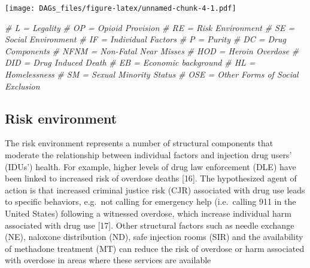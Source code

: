 \documentclass[
]{article}
\newenvironment{Shaded}{\begin{snugshade}}{\end{snugshade}}
\newcommand{\CommentTok}[1]{\textcolor[rgb]{0.56,0.35,0.01}{\textit{#1}}}
\begin{document}
\texttt{[image: DAGs\_files/figure-latex/unnamed-chunk-4-1.pdf]}

\begin{Shaded}
\begin{Highlighting}[]
\CommentTok{\# L = Legality}
\CommentTok{\# OP = Opioid Provision}
\CommentTok{\# RE = Risk Environment}
\CommentTok{\# SE = Social Environment}
\CommentTok{\# IF = Individual Factors}
\CommentTok{\# P = Purity}
\CommentTok{\# DC = Drug Components}
\CommentTok{\# NFNM = Non{-}Fatal Near Misses}
\CommentTok{\# HOD = Heroin Overdose}
\CommentTok{\# DID = Drug Induced Death }
\CommentTok{\# EB = Economic background}
\CommentTok{\# HL = Homelessness}
\CommentTok{\# SM = Sexual Minority Status}
\CommentTok{\# OSE = Other Forms of Social Exclusion}
\end{Highlighting}
\end{Shaded}

\hypertarget{risk-environment}{%
\subsection{Risk environment}\label{risk-environment}}

The risk environment represents a number of structural components that
moderate the relationship between individual factors and injection drug
users' (IDUs') health. For example, higher levels of drug law
enforcement (DLE) have been linked to increased risk of overdose deaths
{[}16{]}. The hypothesized agent of action is that increased criminal
justice risk (CJR) associated with drug use leads to specific behaviors,
e.g.~not calling for emergency help (i.e.~calling 911 in the United
States) following a witnessed overdose, which increase individual harm
associated with drug use {[}17{]}. Other structural factors such as
needle exchange (NE), naloxone distribution (ND), safe injection rooms
(SIR) and the availability of methadone treatment (MT) can reduce the
risk of overdose or harm associated with overdose in areas where these
services are available
\end{document}
